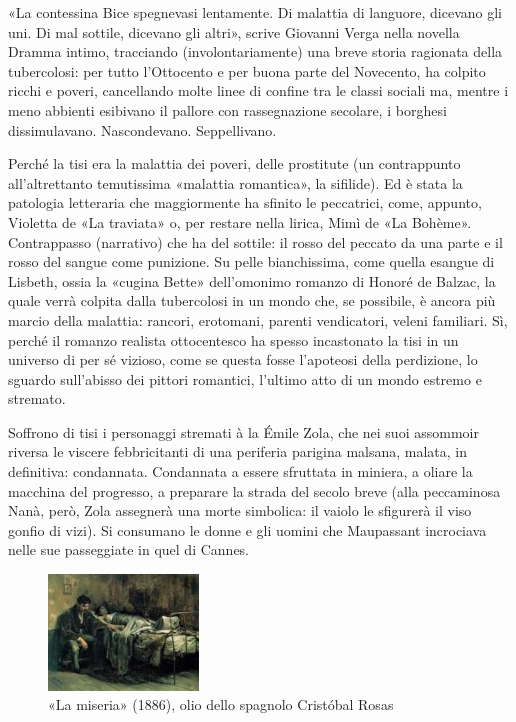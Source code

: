 \documentclass[a4paper, twoside, titlepage]{book}
\newcounter{mar}
\begin{document}
«La contessina Bice spegnevasi lentamente. Di malattia di languore, dicevano gli uni. Di mal sottile, dicevano gli altri», scrive Giovanni Verga nella novella Dramma intimo, tracciando (involontariamente) una breve storia ragionata della tubercolosi: per tutto l’Ottocento e per buona parte del Novecento, ha colpito ricchi e poveri, cancellando molte linee di confine tra le classi sociali ma, mentre i meno abbienti esibivano il pallore con rassegnazione secolare, i borghesi dissimulavano. Nascondevano. Seppellivano.

Perché la tisi era la malattia dei poveri, delle prostitute (un contrappunto all’altrettanto temutissima «malattia romantica», la sifilide). Ed è stata la patologia letteraria che maggiormente ha sfinito le peccatrici, come, appunto, Violetta de «La traviata» o, per restare nella lirica, Mimì de «La Bohème». Contrappasso (narrativo) che ha del sottile: il rosso del peccato da una parte e il rosso del sangue come punizione. Su pelle bianchissima, come quella esangue di Lisbeth, ossia la «cugina Bette» dell’omonimo romanzo di Honoré de Balzac, la quale verrà colpita dalla tubercolosi in un mondo che, se possibile, è ancora più marcio della malattia: rancori, erotomani, parenti vendicatori, veleni familiari. Sì, perché il romanzo realista ottocentesco ha spesso incastonato la tisi in un universo di per sé vizioso, come se questa fosse l’apoteosi della perdizione, lo sguardo sull’abisso dei pittori romantici, l’ultimo atto di un mondo estremo e stremato.

Soffrono di tisi i personaggi stremati à la Émile Zola, che nei suoi assommoir riversa le viscere febbricitanti di una periferia parigina malsana, malata, in definitiva: condannata. Condannata a essere sfruttata in miniera, a oliare la macchina del progresso, a preparare la strada del secolo breve (alla peccaminosa Nanà, però, Zola assegnerà una morte simbolica: il vaiolo le sfigurerà il viso gonfio di vizi). Si consumano le donne e gli uomini che Maupassant incrociava nelle sue passeggiate in quel di Cannes.

\begin{figure}
\centering\includegraphics[width=4cm]{3}
\caption{«La miseria» (1886), olio dello spagnolo Cristóbal Rosas}
\end{figure}
\end{document}

